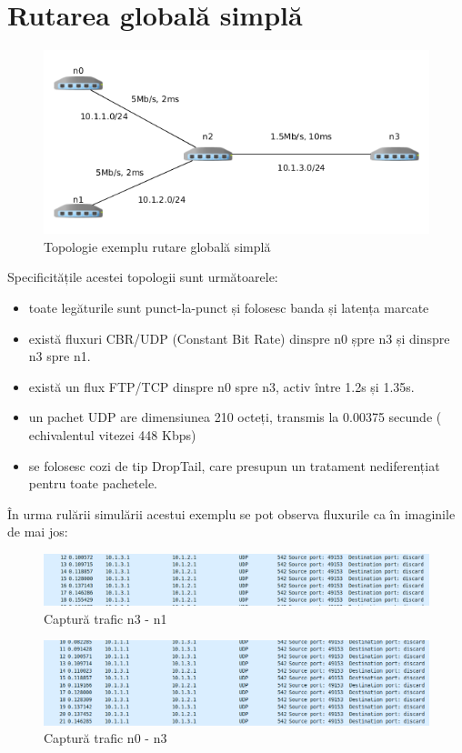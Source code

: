 \documentclass[12pt, a4paper, oneside, romanian]{teza-upb}
\begin{document}
\section{Rutarea globală simplă}
\begin{figure}[H]
\centering
\includegraphics*[scale=0.65]{img/simple_global_routing_topo.png}
\caption{Topologie exemplu rutare globală simplă}
\end{figure}
Specificitățile acestei topologii sunt următoarele:
\begin{itemize}
\item toate legăturile sunt punct-la-punct și folosesc banda și latența marcate
\item există fluxuri CBR/UDP (Constant Bit Rate) dinspre n0 șpre n3 și dinspre n3 spre n1.
\item există un flux FTP/TCP dinspre n0 spre n3, activ între 1.2s și 1.35s.
\item un pachet UDP are dimensiunea 210 octeți, transmis la 0.00375 secunde ( echivalentul vitezei 448 Kbps)
\item se folosesc cozi de tip DropTail, care presupun un tratament nediferențiat pentru toate pachetele. 
\end{itemize}

\newpage

În urma rulării simulării acestui exemplu se pot observa fluxurile ca în imaginile de mai jos: 

\begin{figure}[H]
\centering
\includegraphics*[scale=0.5]{img/simple_global_routing_1.png}
\caption{Captură trafic n3 - n1}
\end{figure}


\begin{figure}[H]
\centering
\includegraphics*[scale=0.5]{img/simple_global_routing_2.png}
\caption{Captură trafic n0 - n3}
\end{figure}
 
\end{document}

